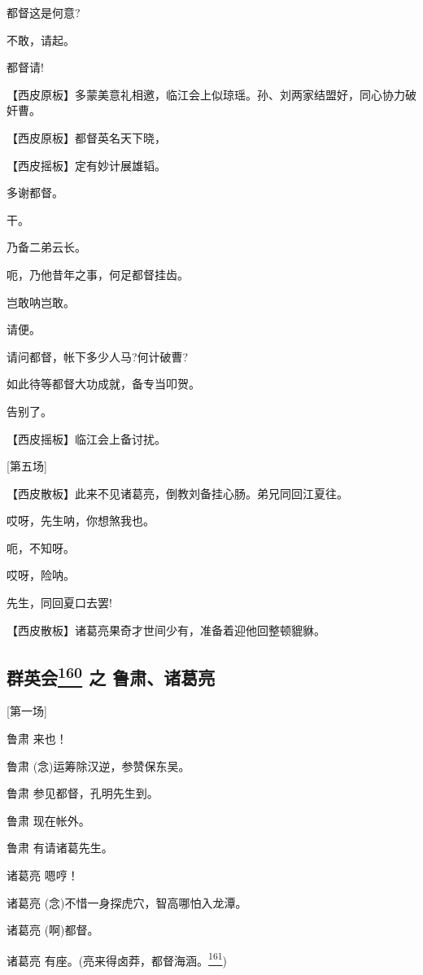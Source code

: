都督这是何意?

不敢，请起。

都督请!

【西皮原板】多蒙美意礼相邀，临江会上似琼瑶。孙、刘两家结盟好，同心协力破奸曹。

【西皮原板】都督英名天下晓，

【西皮摇板】定有妙计展雄韬。

多谢都督。

干。

乃备二弟云长。

呃，乃他昔年之事，何足都督挂齿。

岂敢呐岂敢。

请便。

请问都督，帐下多少人马?何计破曹?

如此待等都督大功成就，备专当叩贺。

告别了。

【西皮摇板】临江会上备讨扰。

{[}第五场{]}

【西皮散板】此来不见诸葛亮，倒教刘备挂心肠。弟兄同回江夏往。

哎呀，先生呐，你想煞我也。

呃，不知呀。

哎呀，险呐。

先生，同回夏口去罢!

【西皮散板】诸葛亮果奇才世间少有，准备着迎他回整顿貔貅。

\newpage
\hypertarget{ux7fa4ux82f1ux4f1a-ux4e4b-ux9c81ux8083ux8bf8ux845bux4eae}{%
\subsection{\texorpdfstring{群英会\protect\hyperlink{fn160}{\textsuperscript{160}}
之
鲁肃、诸葛亮}{群英会160 之 鲁肃、诸葛亮}}\label{ux7fa4ux82f1ux4f1a-ux4e4b-ux9c81ux8083ux8bf8ux845bux4eae}}

{[}第一场{]}

鲁肃 来也！

鲁肃 (念)运筹除汉逆，参赞保东吴。

鲁肃 参见都督，孔明先生到。

鲁肃 现在帐外。

鲁肃 有请诸葛先生。

诸葛亮 嗯哼！

诸葛亮 (念)不惜一身探虎穴，智高哪怕入龙潭。

诸葛亮 (啊)都督。

诸葛亮
有座。(亮来得卤莽，都督海涵。\protect\hyperlink{fn161}{\textsuperscript{161}})

